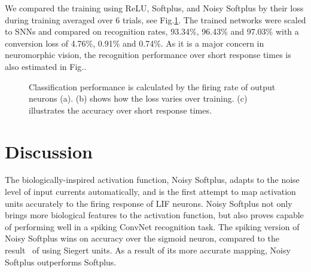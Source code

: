 \documentclass[runningheads,a4paper]{llncs}
\begin{document}
	We compared the training using ReLU, Softplus, and Noisy Softplus by their loss during training averaged over 6 trials, see Fig.\ref{fig:training}.
	The trained networks were scaled to SNNs and compared on recognition rates, 93.34\%, 96.43\% and 97.03\% with a conversion loss of 4.76\%, 0.91\% and 0.74\%.
	As it is a major concern in neuromorphic vision, the recognition performance over short response times is also estimated in Fig..
	\begin{figure}[bt!]
		\centering
		\caption{
			Classification performance is calculated by the firing rate of output neurons (a).
			(b) shows how the loss varies over training.
			(c) illustrates the accuracy over short response times.}
		\label{fig:training}	
	\end{figure}
	
	
	\section{Discussion}
	The biologically-inspired activation function, Noisy Softplus, adapts to the noise level of input currents automatically, and is the first attempt to map activation units accurately to the firing response of LIF neurons.
	Noisy Softplus not only brings more biological features to the activation function, but also proves capable of performing well in a spiking ConvNet recognition task.
	The spiking version of Noisy Softplus wins on accuracy over the sigmoid neuron, compared to the result~\cite{Stromatias2015scalable} of using Siegert units.
	As a result of its more accurate mapping, Noisy Softplus outperforms Softplus.
	
\end{document}
